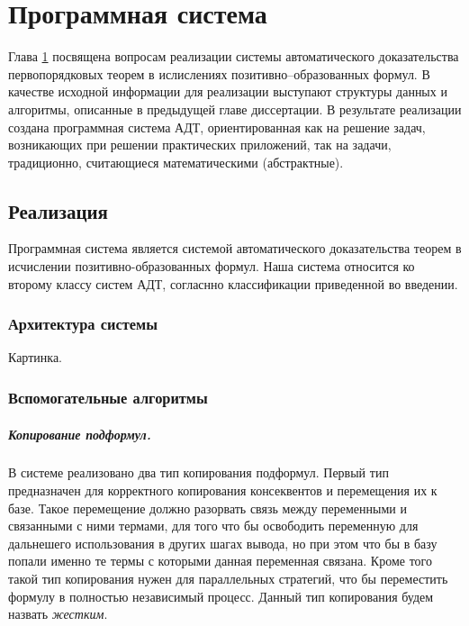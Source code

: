 \chapter{Программная система}\label{part:three}

Глава \ref{part:three} посвящена вопросам реализации системы автоматического доказательства первопорядковых теорем в ислислениях позитивно--образованных формул. В качестве исходной информации для реализации выступают структуры данных и алгоритмы, описанные в предыдущей главе диссертации. В результате реализации создана программная система АДТ, ориентированная как на решение задач, возникающих при решении практических приложений, так на задачи, традиционно, считающиеся математическими (абстрактные).

\section{Реализация}

Программная система является системой автоматического доказательства теорем в исчислении позитивно-образованных формул. Наша система относится ко второму классу систем АДТ, согласнно классификации приведенной во введении.

\subsection{Архитектура системы}
Картинка.



\subsection{Вспомогательные алгоритмы}
\paragraph{Копирование подформул.}
В системе реализовано два тип копирования подформул. Первый тип предназначен для корректного копирования консеквентов и перемещения их к базе. Такое перемещение должно разорвать связь между переменными и связанными с ними термами, для того что бы освободить переменную для дальнешего использования в других шагах вывода, но при этом что бы в базу попали именно те термы с которыми данная переменная связана. Кроме того такой тип копирования нужен для параллельных стратегий, что бы переместить формулу в полностью независимый процесс. Данный тип копирования будем назвать \emph{жестким}.

